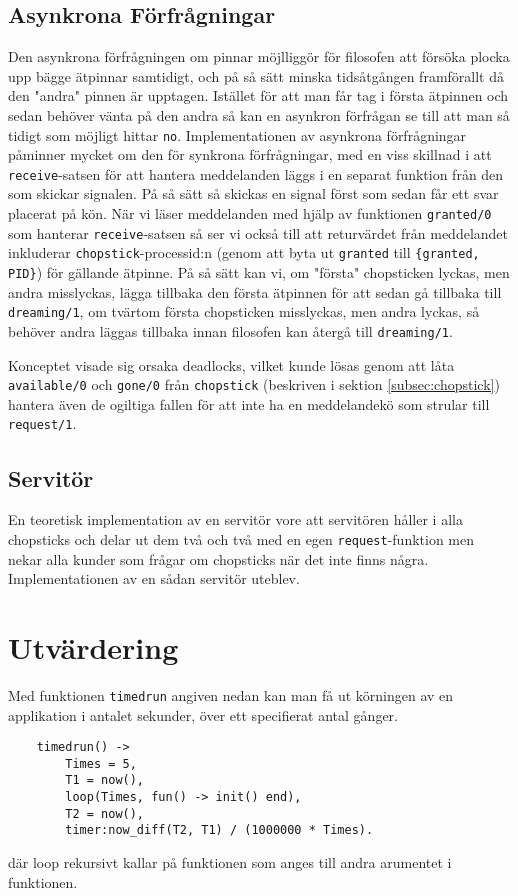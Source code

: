 \documentclass[a4paper, 11pt]{article}
\begin{document}
\subsection{Asynkrona Förfrågningar}
Den asynkrona förfrågningen om pinnar möjlliggör för filosofen att försöka plocka upp bägge ätpinnar samtidigt, och på så sätt minska tidsåtgången framförallt då den "andra" pinnen är upptagen. Istället för att man får tag i första ätpinnen och sedan behöver vänta på den andra så kan en asynkron förfrågan se till att man så tidigt som möjligt hittar \texttt{no}. Implementationen av asynkrona förfrågningar påminner mycket om den för synkrona förfrågningar, med en viss skillnad i att \texttt{receive}-satsen för att hantera meddelanden läggs i en separat funktion från den som skickar signalen. På så sätt så skickas en signal först som sedan får ett svar placerat på kön. När vi läser meddelanden med hjälp av funktionen \texttt{granted/0} som hanterar \texttt{receive}-satsen så ser vi också till att returvärdet från meddelandet inkluderar \texttt{chopstick}-processid:n (genom att byta ut \texttt{granted} till \texttt{\{granted, PID\}}) för gällande ätpinne. På så sätt kan vi, om "första" chopsticken lyckas, men andra misslyckas, lägga tillbaka den första ätpinnen för att sedan gå tillbaka till \texttt{dreaming/1}, om tvärtom första chopsticken misslyckas, men andra lyckas, så behöver andra läggas tillbaka innan filosofen kan återgå till \texttt{dreaming/1}.

Konceptet visade sig orsaka deadlocks, vilket kunde lösas genom att låta \texttt{available/0} och \texttt{gone/0} från \texttt{chopstick} (beskriven i sektion \ref{subsec:chopstick}) hantera även de ogiltiga fallen för att inte ha en meddelandekö som strular till \texttt{request/1}.

\subsection{Servitör}
En teoretisk implementation av en servitör vore att servitören håller i alla chopsticks och delar ut dem två och två med en egen \texttt{request}-funktion men nekar alla kunder som frågar om chopsticks när det inte finns några. Implementationen av en sådan servitör uteblev.

\section{Utvärdering}

Med funktionen \texttt{timedrun} angiven nedan kan man få ut körningen av en applikation i antalet sekunder, över ett specifierat antal gånger.
\begin{lstlisting}
	timedrun() ->
		Times = 5,
		T1 = now(),
		loop(Times, fun() -> init() end),
		T2 = now(),
		timer:now_diff(T2, T1) / (1000000 * Times).
\end{lstlisting}
där loop rekursivt kallar på funktionen som anges till andra arumentet i funktionen.
\end{document}
